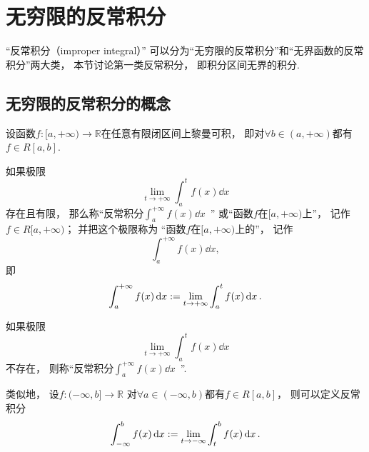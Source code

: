 \section{无穷限的反常积分}
“反常积分（improper integral）”
可以分为“无穷限的反常积分”和“无界函数的反常积分”两大类，
本节讨论第一类反常积分，
即积分区间无界的积分.

\subsection{无穷限的反常积分的概念}
\begin{definition}\label{definition:定积分.无穷限的反常积分的定义1}
设函数\(f\colon[a,+\infty)\to\mathbb{R}\)在任意有限闭区间上黎曼可积，
即对\(\forall b\in(a,+\infty)\)都有\(f \in R[a,b]\).

如果极限\begin{equation*}
	\lim_{t \to +\infty} \int_a^t f(x) \dd{x}
\end{equation*}存在且有限，
那么称“反常积分\(\int_a^{+\infty} f(x) \dd{x}\)~”
或“函数\(f\)在\([a,+\infty)\)上”，
记作\(f \in R[a,+\infty)\)；
并把这个极限称为
“函数\(f\)在\([a,+\infty)\)上的”，
记作\begin{equation*}
	\int_a^{+\infty} f(x) \dd{x},
\end{equation*}
即\begin{equation*}
	\int_a^{+\infty} f(x) \dd{x}
	:=
	\lim_{t \to +\infty} \int_a^t f(x) \dd{x}.
\end{equation*}

如果极限\begin{equation*}
	\lim_{t \to +\infty} \int_a^t f(x) \dd{x}
\end{equation*}不存在，
则称“反常积分\(\int_a^{+\infty} f(x) \dd{x}\)~”.
\end{definition}

类似地，
设\(f\colon(-\infty,b]\to\mathbb{R}\)
对\(\forall a\in(-\infty,b)\)都有\(f \in R[a,b]\)，
则可以定义反常积分\begin{equation*}
	\int_{-\infty}^b f(x) \dd{x}
	:=
	\lim_{t \to -\infty} \int_t^b f(x) \dd{x}.
\end{equation*}

